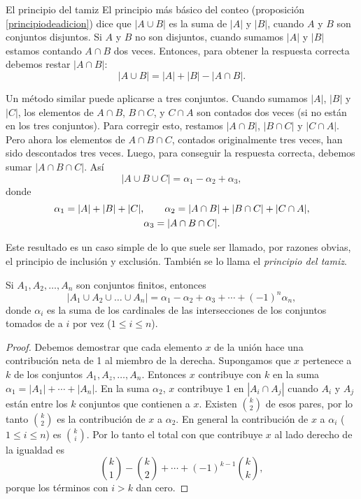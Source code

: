 \begin{section}{El principio del tamiz}\label{Ap1.2}
El principio más básico del conteo (proposición \ref{principiodeadicion}) dice que $|A \cup B|$ es la suma de $|A|$ y $|B|$, cuando $A$ y $B$ son conjuntos disjuntos. Si $A$ y $B$ no son disjuntos, cuando sumamos $|A|$ y $|B|$ estamos contando $A \cap B$ dos veces. Entonces, para obtener la respuesta correcta debemos restar $|A \cap B|$:
$$
|A \cup B| = |A|+|B| - |A \cap B|.
$$

Un método similar puede aplicarse a tres conjuntos. Cuando sumamos $|A|$, $|B|$ y $|C|$, los elementos de $A \cap B$, $B \cap C$, y $C \cap A$ son contados dos veces (si no están en los tres conjuntos). Para corregir esto, restamos $|A \cap B|$, $|B \cap C|$ y $|C \cap A|$. Pero ahora los elementos de $A \cap B \cap C$, contados originalmente tres veces, han sido descontados tres veces. Luego, para conseguir la respuesta correcta, debemos sumar $|A \cap B \cap C|$. Así
$$
|A \cup B\cup C|= \alpha_1-\alpha_2+\alpha_3,
$$ 
donde
$$\gathered
\alpha_1=|A|+|B|+|C|,\qquad \alpha_2= |A \cap B|+|B \cap C|+|C \cap A|, \\
\alpha_3 = |A \cap B \cap C|.
\endgathered
$$

Este resultado es un caso simple de lo que suele ser llamado, por razones obvias, el principio de inclusión y exclusión. También  se lo llama el \textit{principio del tamiz}.  

\begin{teorema}\label{tA1.2} Si $A_1,A_2,\ldots,A_n$ son conjuntos finitos, entonces 
$$ |A_1 \cup A_2 \cup \ldots \cup A_n|= \alpha_1-\alpha_2+\alpha_3 + \cdots +(-1)^n\alpha_n, $$ donde $\alpha_i$ es la suma de los cardinales de las intersecciones de los conjuntos tomados de a $i$ por vez ($1\le i \le n$).
\end{teorema}
\begin{proof} Debemos demostrar que cada elemento $x$ de la unión hace una contribución neta de 1 al miembro de la derecha. Supongamos que $x$ pertenece a $k$ de los conjuntos $A_1, A_z,\ldots,A_n$. Entonces $x$  contribuye con $k$ en la suma $\alpha_1=|A_1|+\cdots+|A_n|$. En la suma $\alpha_2$, $x$ contribuye 1 en $|A_i \cap A_j|$ cuando $A_i$ y $A_j$ están entre los $k$ conjuntos que contienen a $x$. Existen $\binom{k}{2}$ de esos pares, por lo tanto $\binom{k}{2}$ es la contribución de $x$ a $\alpha_2$. En general la contribución de $x$ a $\alpha_i$ ($1 \le i \le n$) es $\binom{k}{i}$. Por lo tanto el total con que contribuye $x$ al lado derecho de la igualdad es 
$$
\binom{k}{1} -\binom{k}{2} + \cdots + (-1)^{k-1} \binom{k}{k},
$$
porque los términos con $i > k$ dan cero.


\end{proof}
\end{section}
